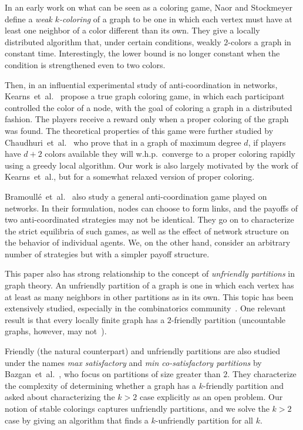 \documentclass{llncs}
\begin{document}
In an early work on what can be seen as a coloring game, Naor and
Stockmeyer~\cite{NaorS93} define a \emph{weak $k$-coloring} of a graph to be
one in which each vertex must have at least one neighbor of a color different
than its own.  They give a locally distributed algorithm that, under certain
conditions, weakly $2$-colors a graph in constant time. Interestingly, the 
lower bound is no longer constant when the condition is strengthened even to
two colors.

Then, in an influential experimental study of anti-coordination in networks,
Kearns~et~al.~\cite{KearnsSM06} propose a true graph coloring game, in which
each participant controlled the color of a node, with the goal of coloring a
graph in a distributed fashion.  The players receive a reward only when a
proper coloring of the graph was found.  The theoretical properties of this
game were further studied by Chaudhuri~et~al.~\cite{ChaudhuriGJ08} who prove
that in a graph of maximum degree $d$, if players have $d + 2$ colors available
they will w.h.p.\ converge to a proper coloring rapidly using a greedy local
algorithm.  Our work is also largely motivated by the work of Kearns~et~al.,
but for a somewhat relaxed version of proper coloring.

Bramoull\'{e}~et~al.~\cite{BramoulleLGV04} also study a general
anti-coordination game played on networks.  In their formulation, nodes can
choose to form links, and the payoffs of two anti-coordinated strategies
may not be identical.  They go on to characterize the strict equilibria of such
games, as well as the effect of network structure on the behavior of individual
agents.  We, on the other hand, consider an arbitrary number of strategies but
with a simpler payoff structure.

This paper also has strong relationship to the concept of \emph{unfriendly
partitions} in graph theory.  An unfriendly partition of a graph is one in
which each vertex has at least as many neighbors in other partitions as in its
own.  This topic has been extensively studied, especially in the combinatorics
community~\cite{AharoniMP90,BruhnDGS10,CowanE,ShelahM90}.  One relevant 
result is that every locally finite graph has a $2$-friendly partition 
(uncountable graphs, however, may not~\cite{ShelahM90}).

Friendly (the natural counterpart) and unfriendly partitions are also studied
under the names \emph{max satisfactory} and \emph{min co-satisfactory
partitions} by Bazgan~et~al.~\cite{BazganTV10}, who focus on partitions of
size greater than $2$.  They characterize the complexity of determining
whether a graph has a $k$-friendly partition and asked about characterizing the
$k > 2$ case explicitly as an open problem.  Our notion of stable colorings
captures unfriendly partitions, and we solve the $k>2$ case by giving an
algorithm that finds a $k$-unfriendly partition for all $k$.
\end{document}
